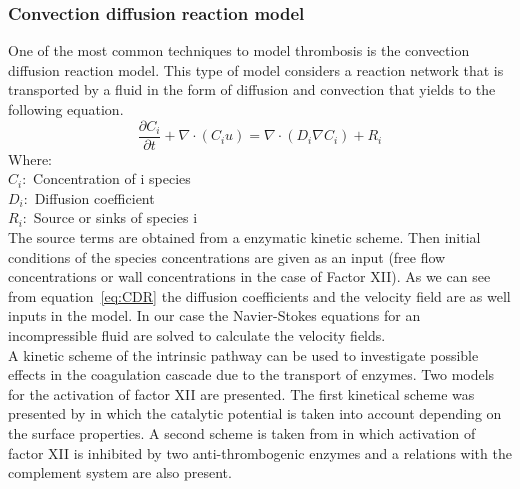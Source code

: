\documentclass[%
 nofootinbib,
 amsmath,amssymb,
 aps,
 pra,
]{revtex4-1}
\begin{document}
\subsubsection{Convection diffusion reaction model}
One of the most common techniques to model thrombosis is the convection diffusion reaction model. This type of model considers a reaction network that is transported by a fluid in the form of diffusion and convection that yields to the following equation. 
\begin{equation}\label{eq:CDR}
\frac{\partial C_{i}}{\partial t} + \nabla \cdot (C_{i}u)  = \nabla \cdot (D_{i} \nabla C_{i}) + R_{i}
\end{equation}
Where: \\
$C_{i} : $ Concentration of i species \\
$D_{i} : $ Diffusion coefficient \\
$R_{i} : $ Source or sinks of species i \\
The source terms are obtained from a enzymatic kinetic scheme. Then initial conditions of the species concentrations are given as an input (free flow concentrations or wall concentrations in the case of Factor XII). As we can see from equation~\ref{eq:CDR} the diffusion coefficients and the velocity field are as well inputs in the model. In our case the Navier-Stokes equations for an incompressible fluid are solved to calculate the velocity fields.\\
A kinetic scheme of the intrinsic pathway can be used to investigate possible effects in the coagulation cascade due to the transport of enzymes. Two models for the activation of factor XII are presented. The first kinetical scheme was presented by \citet{Guo:2006} in which the catalytic potential is taken into account depending on the surface properties. A second scheme is taken from \citet{Chatterjee:2010} in which activation of factor XII is inhibited by two anti-thrombogenic enzymes  and a relations with the complement system are also present.
\end{document}

